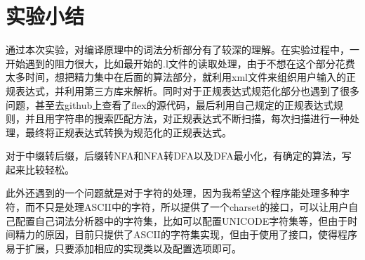\section{实验小结}
通过本次实验，对编译原理中的词法分析部分有了较深的理解。在实验过程中，一开始遇到的阻力很大，比如最开始的.l文件的读取处理，由于不想在这个部分花费太多时间，想把精力集中在后面的算法部分，就利用xml文件来组织用户输入的正规表达式，并利用第三方库来解析。同时对于正规表达式规范化部分也遇到了很多问题，甚至去github上查看了flex的源代码，最后利用自己规定的正规表达式规则，并且用字符串的搜索匹配方法，对正规表达式不断扫描，每次扫描进行一种处理，最终将正规表达式转换为规范化的正规表达式。


对于中缀转后缀，后缀转NFA和NFA转DFA以及DFA最小化，有确定的算法，写起来比较轻松。

此外还遇到的一个问题就是对于字符的处理，因为我希望这个程序能处理多种字符，而不只是处理ASCII中的字符，所以提供了一个charset的接口，可以让用户自己配置自己词法分析器中的字符集，比如可以配置UNICODE字符集等，但由于时间精力的原因，目前只提供了ASCII的字符集实现，但由于使用了接口，使得程序易于扩展，只要添加相应的实现类以及配置选项即可。